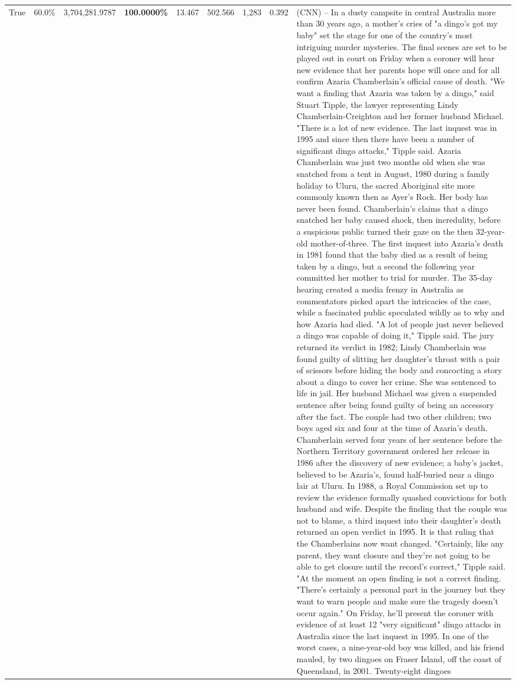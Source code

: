 \begin{table}[H]
\begin{tabular}{lllrlllll}
True & 60.0\% & 3,704,281.9787 & \bfseries \color{red} 100.0000\% & 13.467 & 502.566 & 1,283 & 0.392 & (CNN) -- In a dusty campsite in central Australia more than 30 years ago, a mother's cries of "a dingo's got my baby" set the stage for one of the country's most intriguing murder mysteries. The final scenes are set to be played out in court on Friday when a coroner will hear new evidence that her parents hope will once and for all confirm Azaria Chamberlain's official cause of death. "We want a finding that Azaria was taken by a dingo," said Stuart Tipple, the lawyer representing Lindy Chamberlain-Creighton and her former husband Michael. "There is a lot of new evidence. The last inquest was in 1995 and since then there have been a number of significant dingo attacks," Tipple said. Azaria Chamberlain was just two months old when she was snatched from a tent in August, 1980 during a family holiday to Uluru, the sacred Aboriginal site more commonly known then as Ayer's Rock. Her body has never been found. Chamberlain's claims that a dingo snatched her baby caused shock, then incredulity, before a suspicious public turned their gaze on the then 32-year-old mother-of-three. The first inquest into Azaria's death in 1981 found that the baby died as a result of being taken by a dingo, but a second the following year committed her mother to trial for murder. The 35-day hearing created a media frenzy in Australia as commentators picked apart the intricacies of the case, while a fascinated public speculated wildly as to why and how Azaria had died. "A lot of people just never believed a dingo was capable of doing it," Tipple said. The jury returned its verdict in 1982; Lindy Chamberlain was found guilty of slitting her daughter's throat with a pair of scissors before hiding the body and concocting a story about a dingo to cover her crime. She was sentenced to life in jail. Her husband Michael was given a suspended sentence after being found guilty of being an accessory after the fact. The couple had two other children; two boys aged six and four at the time of Azaria's death. Chamberlain served four years of her sentence before the Northern Territory government ordered her release in 1986 after the discovery of new evidence; a baby's jacket, believed to be Azaria's, found half-buried near a dingo lair at Uluru. In 1988, a Royal Commission set up to review the evidence formally quashed convictions for both husband and wife. Despite the finding that the couple was not to blame, a third inquest into their daughter's death returned an open verdict in 1995. It is that ruling that the Chamberlains now want changed. "Certainly, like any parent, they want closure and they're not going to be able to get closure until the record's correct," Tipple said. "At the moment an open finding is not a correct finding. "There's certainly a personal part in the journey but they want to warn people and make sure the tragedy doesn't occur again." On Friday, he'll present the coroner with evidence of at least 12 "very significant" dingo attacks in Australia since the last inquest in 1995. In one of the worst cases, a nine-year-old boy was killed, and his friend mauled, by two dingoes on Fraser Island, off the coast of Queensland, in 2001. Twenty-eight dingoes 
\end{tabular}
\end{table}
